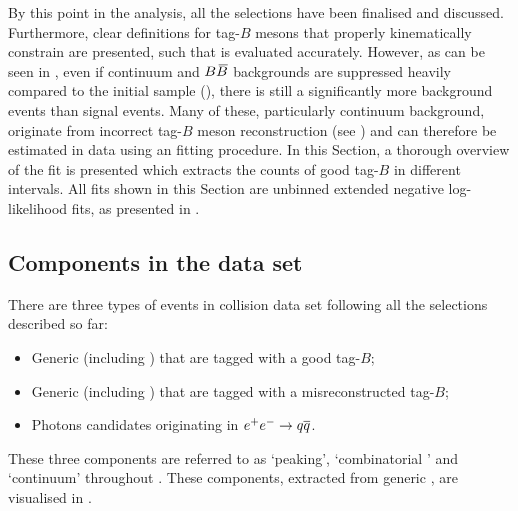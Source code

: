 By this point in the analysis, all the selections have been finalised and discussed.
Furthermore, clear definitions for tag-$B$ mesons that properly kinematically constrain \BtoXsgamma are presented, such that \EB is evaluated accurately.
However, as can be seen in , even if continuum and $B\kern 0.18em\overline{\kern -0.18em B}{}$ backgrounds are suppressed heavily compared to the initial sample (),
there is still a significantly more background events than \BtoXsgamma signal events.
Many of these, particularly continuum background, originate from incorrect tag-$B$ meson reconstruction (see ) and can therefore be estimated in data using an \Mbc fitting procedure.
In this Section, a thorough overview of the \Mbc fit is presented which extracts the counts of good tag-$B$ in different \EB intervals.
All fits shown in this Section are unbinned extended negative log-likelihood fits, as presented in .


\subsection{Components in the data set}\label{sec:fitting_components}

There are three types of events in \epem collision data set following all the selections described so far:
\begin{itemize}
    \item Generic \BB (including \BtoXsgamma) that are tagged with a good tag-$B$;
    \item Generic \BB (including \BtoXsgamma) that are tagged with a misreconstructed tag-$B$;
    \item Photons candidates originating in $e^+e^-\rightarrow q\overline q$.
\end{itemize}
These three components are referred to as `peaking', `combinatorial \BB' and `continuum' throughout .
These components, extracted from generic \MC, are visualised in .

